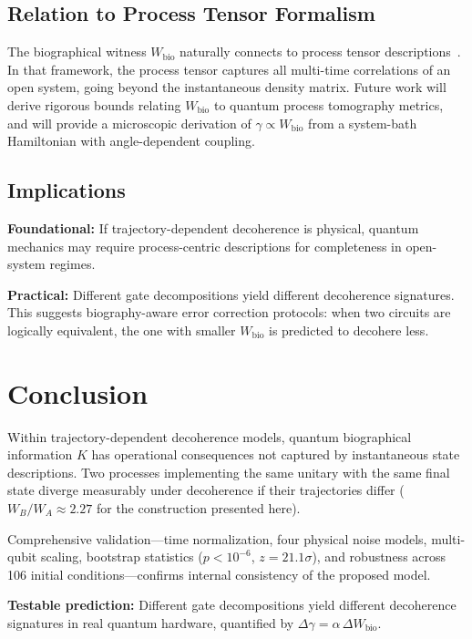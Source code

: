 \documentclass[12pt,a4paper]{article}
\begin{document}
\subsection{Relation to Process Tensor Formalism}

The biographical witness $W_{\mathrm{bio}}$ naturally connects to process
tensor descriptions~\citep{milz2021quantum}. In that framework, the
process tensor captures all multi-time correlations of an open system,
going beyond the instantaneous density matrix. Future work will derive
rigorous bounds relating $W_{\mathrm{bio}}$ to quantum process tomography
metrics, and will provide a microscopic derivation of $\gamma \propto
W_{\mathrm{bio}}$ from a system-bath Hamiltonian with angle-dependent
coupling.

\subsection{Implications}

\textbf{Foundational:} If trajectory-dependent decoherence is physical,
quantum mechanics may require process-centric descriptions for
completeness in open-system regimes.

\textbf{Practical:} Different gate decompositions yield different
decoherence signatures. This suggests biography-aware error correction
protocols: when two circuits are logically equivalent, the one with
smaller $W_{\mathrm{bio}}$ is predicted to decohere less.

\section{Conclusion}

Within trajectory-dependent decoherence models, quantum biographical
information $K$ has operational consequences not captured by instantaneous
state descriptions. Two processes implementing the same unitary with the same final state diverge measurably under decoherence if their trajectories
differ ($W_B/W_A \approx 2.27$ for the construction presented here).

Comprehensive validation---time normalization, four physical noise models,
multi-qubit scaling, bootstrap statistics ($p < 10^{-6}$, $z = 21.1\sigma$),
and robustness across 106 initial conditions---confirms internal
consistency of the proposed model.

\textbf{Testable prediction:} Different gate decompositions yield different
decoherence signatures in real quantum hardware, quantified by
$\Delta\gamma = \alpha\,\Delta W_{\mathrm{bio}}$.
\end{document}
